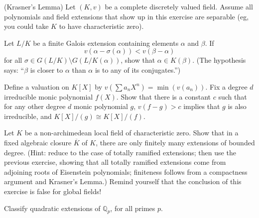 \documentclass[11pt,answers,addpoints,reqno]{exam}
\theoremstyle{definition}
\theoremstyle{remark}
\theoremstyle{definition}
\theoremstyle{remark}
\theoremstyle{remark}
\theoremstyle{remark}
\newcommand{\Q}{\mathbb{Q}}
\begin{document}
\begin{questions}

\question (Krasner's Lemma) Let $(K, v)$ be a complete discretely valued field.
Assume all polynomials and field extensions that show up in this exercise are separable (eg, you could take $K$ to have characteristic zero).
\begin{parts}
\item Let $L/K$ be a finite Galois extension containing elements $\alpha$ and $\beta$. If 
\[
v(\alpha-\sigma(\alpha)) < v(\beta-\alpha)
\]
for all $\sigma \in G(L/K) \setminus G(L/K(\alpha))$, show that $\alpha \in K(\beta)$. (The hypothesis says: ``$\beta$ is closer to $\alpha$ than $\alpha$ is to any of its conjugates.'')
\item Define a valuation on $K[X]$ by $v(\sum a_n X^n)= \min(v(a_n))$. Fix a degree $d$ irreducible monic polynomial $f(X)$. Show that there is a constant $c$ such that for any other degree $d$ monic polynomial $g$, $v(f-g)>c$ implies that $g$ is also irreducible, and $K[X]/(g) \cong K[X]/(f)$.
\item Let $K$ be a non-archimedean local field of characteristic zero. Show that in a fixed algebraic closure $\overline{K}$ of $K$, there are only finitely many extensions of bounded degree. (Hint: reduce to the case of totally ramified extensions; then use the previous exercise, showing that all totally ramified extensions come from adjoining roots of Eisenstein polynomials; finiteness follows from a compactness argument and Krasner's Lemma.) Remind yourself that the conclusion of this exercise is false for global fields!
\end{parts}

\question Classify quadratic extensions of $\Q_p$, for all primes $p$.
\end{questions}
\end{document}
